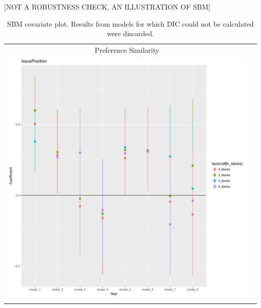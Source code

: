 \documentclass[fleqn,12pt]{wlscirep}
\begin{document}
\restoregeometry


[NOT A ROBUSTNESS CHECK, AN ILLUSTRATION OF SBM]


\clearpage
\begin{longtable}[!h]{c@{\hskip 0cm}c}
Preference Similarity \\
\includegraphics[height=.75\textheight, clip=true, trim=.5cm .5cm 0cm .6cm]{figures/rl_plots2/IssuePosition.pdf} \\
\caption{\label{fig:SBM_plot_pref} SBM covariate plot. Results from models for which DIC could not be calculated were discarded.}
\end{longtable}
\end{document}
